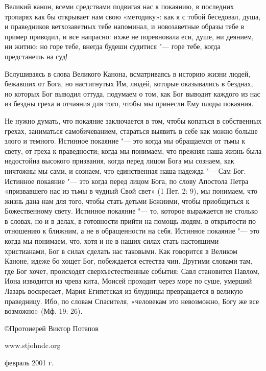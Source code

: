 Великий канон, всеми средствами подвигая нас к покаянию, в последних тропарях как бы открывает нам свою «методику»: как я с тобой беседовал, душа, и праведников ветхозаветных тебе напоминал, и новозаветные образы тебе в пример приводил, и все напрасно: ихже не поревновала еси, душе, ни деянием, ни житию: но горе тебе, внегда будеши судитися "--- горе тебе, когда предстанешь на суд!


Вслушиваясь в слова Великого Канона, всматриваясь в историю жизни людей, бежавших от Бога, но настигнутых Им, людей, которые оказывались в безднах, но которых Бог выводил оттуда, подумаем о том, как Бог выводит каждого из нас из бездны греха и отчаяния для того, чтобы мы принесли Ему плоды покаяния.


Не нужно думать, что покаяние заключается в том, чтобы копаться в собственных грехах, заниматься самобичеванием, стараться выявить в себе как можно больше злого и темного. Истинное покаяние "--- это когда мы обращаемся от тьмы к свету, от греха к праведности; когда мы понимаем, что прежняя наша жизнь была недостойна высокого призвания, когда перед лицом Бога мы сознаем, как ничтожны мы сами, и сознаем, что единственная наша надежда "--- Сам Бог. Истинное покаяние "--- это когда перед лицом Бога, по слову Апостола Петра «призвавшего нас из тьмы в чудный Свой свет» (1 Пет. 2: 9), мы понимаем, что жизнь дана нам для того, чтобы стать детьми Божиими, чтобы приобщиться к Божественному свету. Истинное покаяние "--- то, которое выражается не столько в словах, но и в делах, в готовности прийти на помощь людям, в открытости по отношению к ближним, а не в обращенности на себя. Истинное покаяние "--- это когда мы понимаем, что, хотя и не в наших силах стать настоящими христианами, Бог в силах сделать нас таковыми. Как говорится в Великом Каноне, идеже бо хощет Бог, побеждается естества чин. Другими словами там, где Бог хочет, происходят сверхъестественные события: Савл становится Павлом, Иона изводится из чрева кита, Моисей проходит через море по суше, умерший Лазарь воскресает, Мария Египетская из блудницы превращается в великую праведницу. Ибо, по словам Спасителя, «человекам это невозможно, Богу же все возможно» (Мф. 19: 26).


©Протоиерей Виктор Потапов


www.stjohndc.org


февраль 2001 г.
\mychapterending

 

